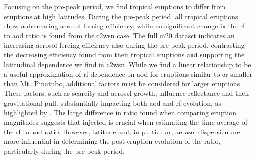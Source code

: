 \documentclass{ametsocV6.1}
\newcommand{\iso}[1][i]{{#1}njected \ce{SO2}}
\begin{document}
Focusing on the pre-peak period, we find tropical eruptions to differ from eruptions at
high latitudes. During the pre-peak period, all tropical eruptions show a decreasing
aerosol forcing efficiency, while no significant change in the \gls{rf} to \gls{aod}
ratio is found from the \gls{c2wsn} case. The full \gls{m20} dataset indicates an
increasing aerosol forcing efficiency also during the pre-peak period, contrasting the
decreasing efficiency found from their tropical eruptions and supporting the latitudinal
dependence we find in \gls{c2wsn}. While we find a linear relationship to be a useful
approximation of \gls{rf} dependence on \gls{aod} for eruptions similar to or smaller
than Mt.\ Pinatubo, additional factors must be considered for larger eruptions. These
factors, such as  scarcity and aerosol growth, influence reflectance and their
gravitational pull, substantially impacting both \gls{aod} and \gls{rf} evolution, as
highlighted by \citet{timmreck2010}. The large difference in ratio found when comparing
eruption magnitudes suggests that \iso{} is crucial when estimating the time-average of
the \gls{rf} to \gls{aod} ratio. However, latitude and, in particular, aerosol
dispersion are more influential in determining the post-eruption evolution of the ratio,
particularly during the pre-peak period.
\end{document}
